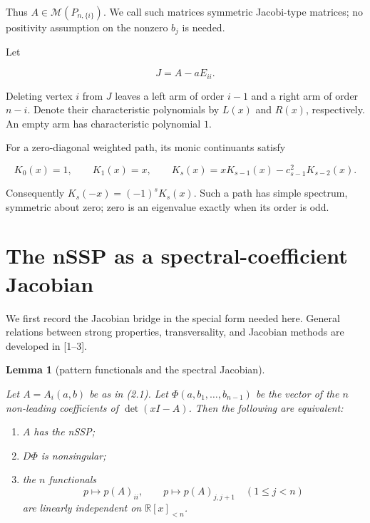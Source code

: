 \documentclass[11pt]{article}
\newtheorem{lemma}[theorem]{Lemma}
\theoremstyle{remark}
\begin{document}
Thus $A\in\mathcal M(P_{n,\{i\}})$. We call such matrices symmetric Jacobi-type matrices; no
positivity assumption on the nonzero $b_j$ is needed.

Let

\[
  J=A-aE_{ii}.
\]

Deleting vertex $i$ from $J$ leaves a left arm of order $i-1$ and a right arm of order
$n-i$. Denote their characteristic polynomials by $L(x)$ and $R(x)$, respectively. An empty arm
has characteristic polynomial $1$.

For a zero-diagonal weighted path, its monic continuants satisfy

\[
  K_0(x)=1,\qquad K_1(x)=x,\qquad
  K_s(x)=xK_{s-1}(x)-c_{s-1}^2K_{s-2}(x).                \tag{2.2}
\]

Consequently $K_s(-x)=(-1)^sK_s(x)$. Such a path has simple spectrum, symmetric about zero; zero is
an eigenvalue exactly when its order is odd.

\section{The nSSP as a spectral-coefficient Jacobian}


We first record the Jacobian bridge in the special form needed here. General relations between strong
properties, transversality, and Jacobian methods are developed in [1--3].

\begin{lemma}[pattern functionals and the spectral Jacobian]
\label{lemma:3-1}

Let $A=A_i(a,b)$ be as in (2.1). Let $\Phi(a,b_1,\ldots,b_{n-1})$ be the vector of the $n$
non-leading coefficients of $\det(xI-A)$. Then the following are equivalent:

\begin{enumerate}
\item $A$ has the nSSP;
\item $D\Phi$ is nonsingular;
\item the $n$ functionals
   \[
     p\longmapsto p(A)_{ii},\qquad
     p\longmapsto p(A)_{j,j+1}\quad(1\leq j<n)
   \]
   are linearly independent on $\mathbb R[x]_{<n}$.
\end{enumerate}
\end{lemma}
\end{document}
